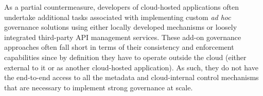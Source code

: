 As a partial countermeasure, developers of cloud-hosted applications often 
undertake additional tasks associated with 
implementing custom {\em ad hoc} governance solutions using either locally
developed mechanisms or loosely integrated
third-party API management services. 
These add-on governance
approaches often fall short in terms of their consistency and enforcement
capabilities since
by definition they have to operate outside the
cloud (either external to it or as another cloud-hosted application). 
As such, they do not have the end-to-end 
access to all the metadata and cloud-internal control mechanisms
that are necessary to implement strong governance at scale. 